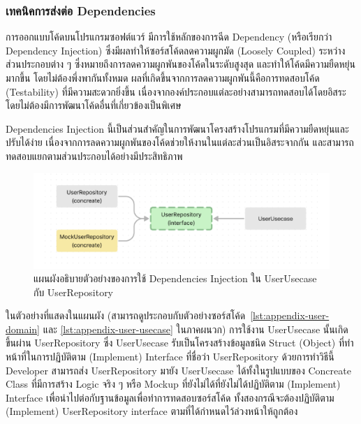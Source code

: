 \documentclass[12pt,one side,openright,a4paper]{cpe-thesis-th}
\newcommand{\thaijustify}[1]{%
  \par\hspace{30pt}\justifying
  #1
}
\begin{document}
\subsubsection{เทคนิคการส่งต่อ Dependencies}
\thaijustify{
  การออกแบบโค้ดบนโปรแกรมซอฟต์แวร์ มีการใช้หลักของการฉีด Dependency (หรือเรียกว่า Dependency Injection) ซึ่งมีผลทำให้ซอร์สโค้ดลดความผูกมัด (Loosely Coupled) ระหว่างส่วนประกอบต่าง ๆ ซึ่งหมายถึงการลดความผูกพันของโค้ดในระดับสูงสุด และทำให้โค้ดมีความยืดหยุ่นมากขึ้น โดยไม่ต้องพึ่งพากันทั้งหมด ผลที่เกิดขึ้นจากการลดความผูกพันนี้คือการทดสอบโค้ด (Testability) ที่มีความสะดวกยิ่งขึ้น เนื่องจากองค์ประกอบแต่ละอย่างสามารถทดสอบได้โดยอิสระ โดยไม่ต้องมีการพัฒนาโค้ดอื่นที่เกี่ยวข้องเป็นพิเศษ
}
\thaijustify{
  Dependencies Injection นี้เป็นส่วนสำคัญในการพัฒนาโครงสร้างโปรแกรมที่มีความยืดหยุ่นและปรับได้ง่าย เนื่องจากการลดความผูกพันของโค้ดช่วยให้งานในแต่ละส่วนเป็นอิสระจากกัน และสามารถทดสอบแยกตามส่วนประกอบได้อย่างมีประสิทธิภาพ
}
\begin{figure}[H]
  \centering
  \includegraphics[width=12cm]{figure/results/deps-inject.png}
  \caption[แผนผังอธิบายตัวอย่างของการใช้ Dependencies Injection]{แผนผังอธิบายตัวอย่างของการใช้ Dependencies Injection ใน UserUsecase กับ UserRepository}
  \label{fig:res-deps-inject}
\end{figure}
\thaijustify{
  ในตัวอย่างที่แสดงในแผนผัง (สามารถดูประกอบกับตัวอย่างซอร์สโค้ด~\ref{lst:appendix-user-domain} และ \ref{lst:appendix-user-usecase} ในภาคผนวก) การใช้งาน UserUsecase นั้นเกิดขึ้นผ่าน UserRepository ซึ่ง UserUsecase รับเป็นโครงสร้างข้อมูลชนิด Struct (Object) ที่ทำหน้าที่ในการปฏิบัติตาม (Implement) Interface ที่ชื่อว่า UserRepository ด้วยการทำวิธีนี้ Developer สามารถส่ง UserRepository มายัง UserUsecase ได้ทั้งในรูปแบบของ Concreate Class ที่มีการสร้าง Logic จริง ๆ หรือ Mockup ที่ยังไม่ได้ที่ยังไม่ได้ปฏิบัติตาม (Implement) Interface เพื่อนำไปต่อกับฐานข้อมูลเพื่อทำการทดสอบซอร์สโค้ด ทั้งสองกรณีจะต้องปฏิบัติตาม (Implement) UserRepository interface ตามที่ได้กำหนดไว้ล่วงหน้าให้ถูกต้อง
}
\end{document}
